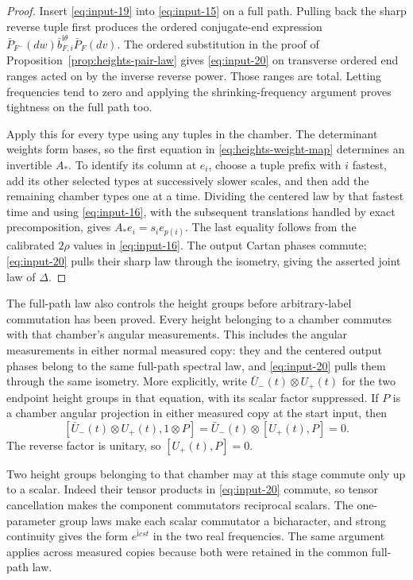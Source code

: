 \begin{proof}
Insert \eqref{eq:input-19} into \eqref{eq:input-15} on a full path.
Pulling back the sharp reverse tuple first produces the ordered
conjugate-end expression
$\bar P_{F^-}(dw)\bar b_{F,i}^{\mathrm i\theta}\bar P_F(dv)$.
The ordered substitution in the proof of
Proposition~\ref{prop:heights-pair-law} gives
\eqref{eq:input-20} on transverse ordered end ranges acted on by the inverse
reverse power.  Those ranges are total.  Letting frequencies tend to zero
and applying the shrinking-frequency argument proves tightness on the
full path too.

Apply this for every type using any tuples in the chamber.  The determinant
weights form bases, so the first equation in
\eqref{eq:heights-weight-map} determines an invertible $A_*$.  To identify
its column at $e_i$, choose a tuple prefix with $i$ fastest, add its
other selected types at successively slower scales, and then add the
remaining chamber types one at a time.  Dividing the centered law by that fastest time and
using \eqref{eq:input-16}, with the subsequent translations handled by exact
precomposition, gives $A_*e_i=s_i e_{p(i)}$.  The last equality follows
from the calibrated $2\rho$ values in \eqref{eq:input-16}.  The output
Cartan phases commute; \eqref{eq:input-20} pulls their sharp law through the
isometry, giving the asserted joint law of $\Delta$.
\end{proof}

The full-path law also controls the height groups before arbitrary-label
commutation has been proved. Every height belonging to a chamber commutes
with that chamber's angular measurements. This includes the angular
measurements in either normal measured copy: they and the centered output
phases belong to the same full-path spectral law, and
\eqref{eq:input-20} pulls them through the same isometry. More explicitly,
write $\bar U_-(t)\otimes U_+(t)$ for the two endpoint height groups
in that equation, with its scalar factor suppressed. If $P$ is a chamber
angular projection in either measured copy at the start input, then
\[
 [\bar U_-(t)\otimes U_+(t),1\otimes P]
   =\bar U_-(t)\otimes[U_+(t),P]=0.
\]
The reverse factor is unitary, so $[U_+(t),P]=0$.

Two height groups belonging to that chamber may at this stage commute
only up to a scalar. Indeed their tensor products in
\eqref{eq:input-20} commute, so tensor cancellation makes the component
commutators reciprocal scalars. The one-parameter group laws make each
scalar commutator a bicharacter,
and strong continuity gives the form $e^{\mathrm icst}$ in the two real
frequencies.
The same argument applies across measured copies because both were
retained in the common full-path law.

